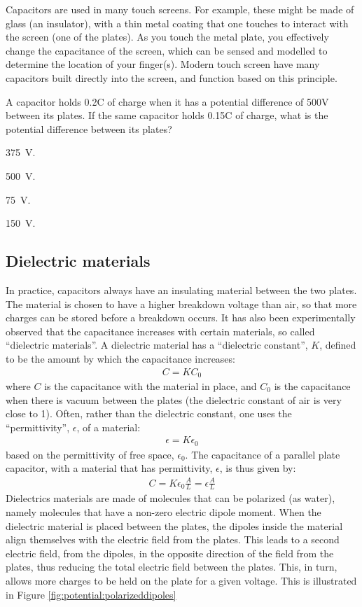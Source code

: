 Capacitors are used in many touch screens. For example, these might be made of glass (an insulator), with a thin metal coating that one touches to interact with the screen (one of the plates). As you touch the metal plate, you effectively change the capacitance of the screen, which can be sensed and modelled to determine the location of your finger(s). Modern touch screen have many capacitors built directly into the screen, and function based on this principle. 

\begin{checkpoint}
	\begin{MCquestion}{A capacitor holds 0.2C of charge when it has a potential difference of 500V between its plates. If the same capacitor holds 0.15C of charge, what is the potential difference between its plates?}
		\item \SI{375}{V}. \correct
		\item \SI{500}{V}.
		\item \SI{75}{V}.
		\item \SI{150}{V}.
	\end{MCquestion}
\end{checkpoint}

\subsection{Dielectric materials}
In practice, capacitors always have an insulating material between the two plates. The material is chosen to have a higher breakdown voltage than air, so that more charges can be stored before a breakdown occurs. It has also been experimentally observed that the capacitance increases with certain materials, so called ``dielectric materials''. A dielectric material has a ``dielectric constant'', $K$, defined to be the amount by which the capacitance increases:
\begin{align*}
C=KC_0
\end{align*}
where $C$ is the capacitance with the material in place, and $C_0$ is the capacitance when there is vacuum between the plates (the dielectric constant of air is very close to 1). Often, rather than the dielectric constant, one uses the ``permittivity'', $\epsilon$, of a material:
\begin{align*}
\epsilon=K\epsilon_0
\end{align*}
based on the permittivity of free space, $\epsilon_0$. The capacitance of a parallel plate capacitor, with a material that has permittivity, $\epsilon$, is thus given by:
\begin{align*}
C=K\epsilon_0\frac{A}{L}=\epsilon\frac{A}{L}
\end{align*}
Dielectrics materials are made of molecules that can be polarized (as water), namely molecules that have a non-zero electric dipole moment. When the dielectric material is placed between the plates, the dipoles inside the material align themselves with the electric field from the plates. This leads to a second electric field, from the dipoles, in the opposite direction of the field from the plates, thus reducing the total electric field between the plates. This, in turn, allows more charges to be held on the plate for a given voltage. This is illustrated in Figure \ref{fig:potential:polarizeddipoles}

